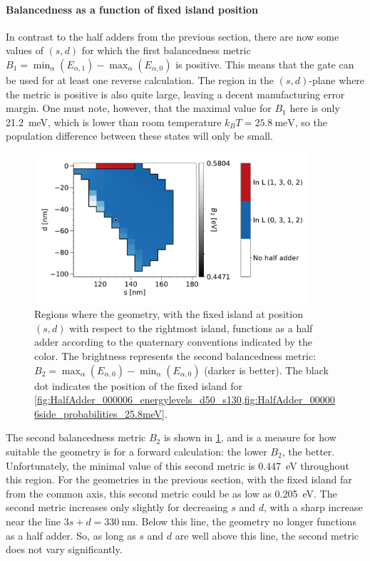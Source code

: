\documentclass[11pt,a4paper,english,twoside]{article}
\begin{document}
\paragraph{Balancedness as a function of fixed island position}
In contrast to the half adders from the previous section, there are now some values of $(s,d)$ for which the first balancedness metric $B_1 = \min_\alpha(E_{\alpha,1}) - \max_\alpha(E_{\alpha,0})$ is positive. This means that the gate can be used for at least one reverse calculation. The region in the $(s,d)$-plane where the metric is positive is also quite large, leaving a decent manufacturing error margin. One must note, however, that the maximal value for $B_1$ here is only \SI{21.2}{\milli\electronvolt}, which is lower than room temperature $k_B T = \SI{25.8}{\milli\electronvolt}$, so the population difference between these states will only be small. \par
\begin{figure}[b!]
    \centering
    \includegraphics[width=0.9\textwidth]{Figures/half_adder/sweep/000006_d-s/tableside(d0-100_5,s100-180_5)_balanced2.pdf}
    \caption{Regions where the geometry, with the fixed island at position $(s, d)$ with respect to the rightmost island, functions as a half adder according to the quaternary conventions indicated by the color. The brightness represents the second balancedness metric: $B_2 = \max_\alpha(E_{\alpha,0}) - \min_\alpha(E_{\alpha,0})$ (darker is better). The black dot indicates the position of the fixed island for \cref{fig:HalfAdder_000006_energylevels_d50_s130,fig:HalfAdder_000006side_probabilities_25.8meV}.} 
    \label{fig:HalfAdder_000006_sweepnew_d-s_balanced2}
\end{figure}
The second balancedness metric $B_2$ is shown in \cref{fig:HalfAdder_000006_sweepnew_d-s_balanced2}, and is a measure for how suitable the geometry is for a forward calculation: the lower $B_2$, the better. Unfortunately, the minimal value of this second metric is \SI{0.447}{\electronvolt} throughout this region. For the geometries in the previous section, with the fixed island far from the common axis, this second metric could be as low as \SI{0.205}{\electronvolt}. The second metric increases only slightly for decreasing $s$ and $d$, with a sharp increase near the line $3s+d=\SI{330}{\nano\metre}$. Below this line, the geometry no longer functions as a half adder. So, as long as $s$ and $d$ are well above this line, the second metric does not vary significantly. \par
\end{document}
